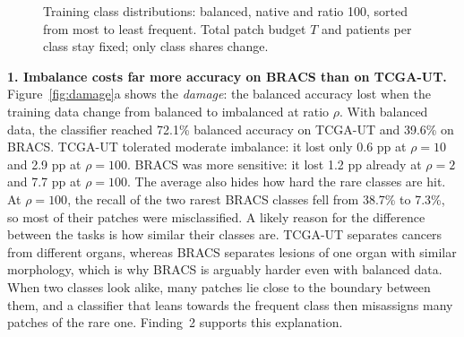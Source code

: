 \documentclass[11pt,a4paper]{article}
\newcommand{\countlines}[1]{%
  \addplot[black,thick,mark=*,mark size=1pt] table[x=rank,y=r1]{#1};
  \addplot[red!80!black,thick,dashed,mark=square*,mark size=1pt] table[x=rank,y=N]{#1};
  \addplot[tcga,thick,mark=triangle*,mark size=1.4pt] table[x=rank,y=r100]{#1};}
\begin{document}
\begin{figure}[!htb]
\centering
{}
\caption{Training class distributions: balanced, native and ratio 100, sorted from most to least frequent. Total patch budget $T$ and patients per class stay fixed; only class shares change.}\label{fig:dist}
\end{figure}

\smallskip\noindent\textbf{1. Imbalance costs far more accuracy on BRACS than on TCGA-UT.}
Figure~\ref{fig:damage}a shows the \emph{damage}: the balanced accuracy lost when the training data change from balanced to imbalanced at ratio $\rho$.
With balanced data, the classifier reached 72.1\% balanced accuracy on TCGA-UT and 39.6\% on BRACS.
TCGA-UT tolerated moderate imbalance: it lost only 0.6 pp at $\rho=10$ and 2.9 pp at $\rho=100$.
BRACS was more sensitive: it lost 1.2 pp already at $\rho=2$ and 7.7 pp at $\rho=100$.
The average also hides how hard the rare classes are hit.
At $\rho=100$, the recall of the two rarest BRACS classes fell from 38.7\% to 7.3\%, so most of their patches were misclassified.
A likely reason for the difference between the tasks is how similar their classes are.
TCGA-UT separates cancers from different organs, whereas BRACS separates lesions of one organ with similar morphology, which is why BRACS is arguably harder even with balanced data.
When two classes look alike, many patches lie close to the boundary between them, and a classifier that leans towards the frequent class then misassigns many patches of the rare one.
Finding~2 supports this explanation.
\end{document}
